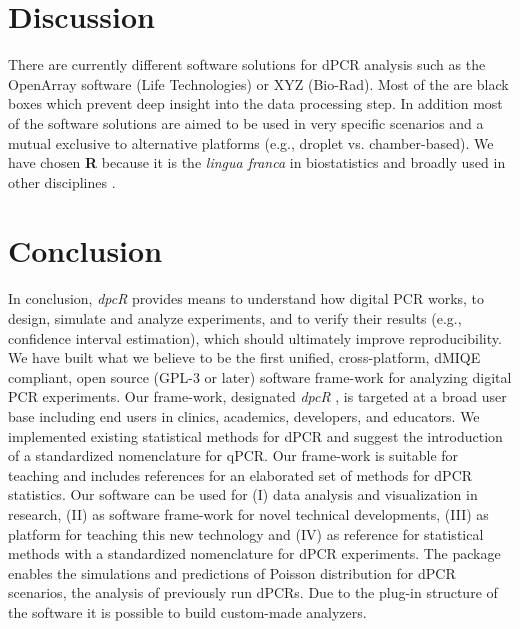 \documentclass{bioinfo}
\begin{document}
\section{Discussion}

There are currently different software solutions for dPCR analysis such as the 
OpenArray software (Life Technologies) or XYZ (Bio-Rad). Most of the are black 
boxes which prevent deep insight into the data processing step. In addition most 
of the software solutions are aimed to be used in very specific scenarios and a 
mutual exclusive to alternative platforms (e.g., droplet vs. chamber-based). We 
have chosen \textbf{R} because it is the \textit{lingua franca} in biostatistics and broadly used 
in other disciplines \cite{rodiger_r_2015}.



%
%






\section{Conclusion}

In conclusion, \textit{dpcR} provides means to understand how digital PCR works, 
to design, simulate and analyze experiments, and to verify their results (e.g., 
confidence interval estimation), which should ultimately improve 
reproducibility. We have built what we believe to be the first unified, 
cross-platform, dMIQE compliant, open source (GPL-3 or later) software frame-work for 
analyzing digital PCR experiments. Our frame-work, designated \textit{dpcR} , is 
targeted at a broad user base including end users in clinics, academics, 
developers, and educators. We implemented existing statistical methods for dPCR 
and suggest the introduction of a standardized nomenclature for qPCR. Our 
frame-work is suitable for teaching and includes references for an elaborated 
set of methods for dPCR statistics. Our software can be used for (I) data 
analysis and visualization in research, (II) as software frame-work for novel 
technical developments, (III) as platform for teaching this new technology and 
(IV) as reference for statistical methods with a standardized nomenclature for 
dPCR experiments. The package enables the simulations and predictions of Poisson 
distribution for dPCR scenarios, the analysis of previously run dPCRs. Due to 
the plug-in structure of the software it is possible to build custom-made 
analyzers.
\end{document}
